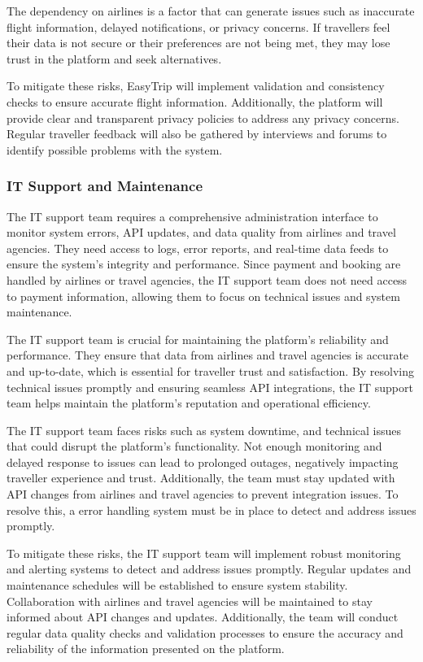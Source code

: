 The dependency on airlines is a factor that can generate issues such as inaccurate flight information, delayed notifications, or privacy concerns. If travellers feel their data is not secure or their preferences are not being met, they may lose trust in the platform and seek alternatives.

To mitigate these risks, EasyTrip will implement validation and consistency checks to ensure accurate flight information. Additionally, the platform will provide clear and transparent privacy policies to address any privacy concerns. Regular traveller feedback will also be gathered by interviews and forums to identify possible problems with the system. 

\subsubsection{IT Support and Maintenance}
The IT support team requires a comprehensive administration interface to monitor system errors, API updates, and data quality from airlines and travel agencies. They need access to logs, error reports, and real-time data feeds to ensure the system's integrity and performance. Since payment and booking are handled by airlines or travel agencies, the IT support team does not need access to payment information, allowing them to focus on technical issues and system maintenance.

The IT support team is crucial for maintaining the platform's reliability and performance. They ensure that data from airlines and travel agencies is accurate and up-to-date, which is essential for traveller trust and satisfaction. By resolving technical issues promptly and ensuring seamless API integrations, the IT support team helps maintain the platform's reputation and operational efficiency.

The IT support team faces risks such as system downtime, and technical issues that could disrupt the platform's functionality. Not enough monitoring and delayed response to issues can lead to prolonged outages, negatively impacting traveller experience and trust. Additionally, the team must stay updated with API changes from airlines and travel agencies to prevent integration issues. To resolve this, a error handling system must be in place to detect and address issues promptly.

To mitigate these risks, the IT support team will implement robust monitoring and alerting systems to detect and address issues promptly. Regular updates and maintenance schedules will be established to ensure system stability. Collaboration with airlines and travel agencies will be maintained to stay informed about API changes and updates. Additionally, the team will conduct regular data quality checks and validation processes to ensure the accuracy and reliability of the information presented on the platform.

